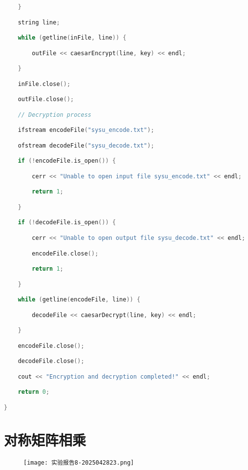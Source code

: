\begin{lstlisting}[language=C++]
    }

    string line;

    while (getline(inFile, line)) {

        outFile << caesarEncrypt(line, key) << endl;

    }

    inFile.close();

    outFile.close();

    // Decryption process

    ifstream encodeFile("sysu_encode.txt");

    ofstream decodeFile("sysu_decode.txt");

    if (!encodeFile.is_open()) {

        cerr << "Unable to open input file sysu_encode.txt" << endl;

        return 1;

    }

    if (!decodeFile.is_open()) {

        cerr << "Unable to open output file sysu_decode.txt" << endl;

        encodeFile.close();

        return 1;

    }

    while (getline(encodeFile, line)) {

        decodeFile << caesarDecrypt(line, key) << endl;

    }

    encodeFile.close();

    decodeFile.close();

    cout << "Encryption and decryption completed!" << endl;

    return 0;

}
\end{lstlisting}
\section{对称矩阵相乘}

\begin{figure}[H]
\centering
\texttt{[image: 实验报告8-2025042823.png]}
\label{}
\end{figure}

